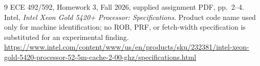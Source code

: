 \documentclass[11pt]{article}
\begin{document}
\begin{thebibliography}{9}
 ECE 492/592, Homework 3, Fall 2026, supplied assignment PDF, pp.\ 2--4.
 Intel, \emph{Intel Xeon Gold 5420+ Processor: Specifications}. Product code name used only for machine identification; no ROB, PRF, or fetch-width specification is substituted for an experimental finding.\\
\url{https://www.intel.com/content/www/us/en/products/sku/232381/intel-xeon-gold-5420-processor-52-5m-cache-2-00-ghz/specifications.html}
\end{thebibliography}
\end{document}
